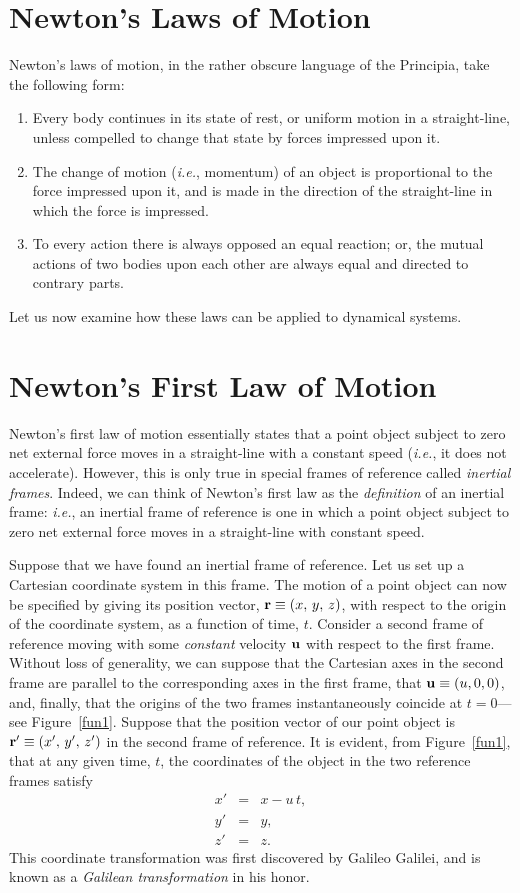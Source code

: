 \section{Newton's Laws of Motion}
Newton's laws of motion,  in the rather obscure language of the Principia,  take the following form:
\begin{enumerate}
\item Every body continues in its state of rest, or uniform motion in a 
straight-line, unless
compelled to change that state by forces impressed upon it.
\item The change of motion ({\em i.e.}, momentum) of an object is proportional to the force impressed upon
it, and is made in the direction of the straight-line in which the force is impressed.
\item To every action there is always opposed an equal reaction; or, the mutual actions
of two bodies upon each other are always equal and directed to contrary parts.  
\end{enumerate}
Let us now examine how these laws can be applied to dynamical systems. 

\section{Newton's First Law of Motion}
Newton's first law of motion essentially states that a  point object
subject to zero net external force moves
in a straight-line  with a constant speed ({\em i.e.}, it does not accelerate). However, this is only true in special frames of reference called {\em inertial frames}.  Indeed, we can think of Newton's
first law as the {\em definition}\/ of an inertial frame: {\em i.e.},
an inertial frame of reference is one in which a point object subject to zero
net external force moves  in a straight-line with constant speed.

Suppose that we have found an inertial frame of reference. Let us
set up a Cartesian coordinate system in this frame. The motion
of a point object can now be specified by giving its position vector, ${\bf r}\equiv (x,\,y,\,z)$,
with respect to the origin of the coordinate system, as a function of time, $t$. 
Consider a second frame of reference moving with some 
{\em constant}\/ velocity
${\bf u}$ with respect to the first frame. Without loss of generality,
we can suppose that the Cartesian axes in the second frame are parallel
to the corresponding axes in the first frame, that ${\bf u} \equiv (u,0,0)$,
and, finally, that the origins of the two frames instantaneously coincide at $t=0$---see Figure~\ref{fun1}. Suppose that the position vector
of our point object is ${\bf r}'\equiv (x',\,y',\,z')$ in the second frame of reference. 
It is evident, from Figure~\ref{fun1}, that at any given time, $t$, the coordinates of the
object in the two reference frames satisfy
\begin{eqnarray}\label{e3.1}
x' &=& x - u\,t,\\[0.5ex]
y' &=& y,\\[0.5ex]
z' &=& z.\label{e3.3}
\end{eqnarray}
This coordinate transformation was first discovered by Galileo Galilei, and is  known as a {\em Galilean transformation}\/
in his honor. 

